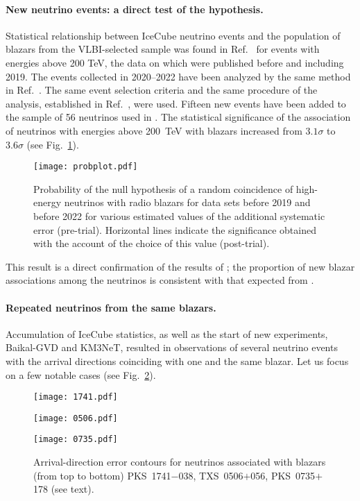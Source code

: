 \documentclass[a4paper,noshowpacs,noshowkeys,floatfix,twocolumn,preprintnumbers,nofootinbib]{revtex4-2}
\begin{document}
\paragraph{New neutrino events: a direct test of the hypothesis.}
Statistical relationship between IceCube neutrino events and the population of blazars from the VLBI-selected sample was found in Ref.~\cite{neutradio1} for events with energies above 200 TeV, the data on which were published before and including 2019. The events collected in 2020--2022 have been analyzed by the same method in Ref.~\cite{neutradio2022}. The same event selection criteria and the same procedure of the analysis, established in Ref.~\cite{neutradio1}, were used. Fifteen new events have been added to the sample of 56 neutrinos used in \cite{neutradio1}. The statistical significance of the association of neutrinos with energies above 200~TeV with blazars increased from $3.1\sigma$ to $3.6\sigma$ (see Fig.~\ref{fig:neutradio2022}).
\begin{figure}
\centerline{\texttt{[image: probplot.pdf]}}
\caption{\label{fig:neutradio2022}
Probability of the null hypothesis of a random coincidence of high-energy neutrinos with radio blazars for data sets before 2019 and before 2022 for various estimated values of the additional systematic error (pre-trial). Horizontal lines indicate the significance obtained with the account of the choice of this value (post-trial).}
\end{figure}
This result is a direct confirmation of the results of \cite{neutradio1}; the proportion of new blazar associations \cite{neutradio2022} among the neutrinos is consistent with that expected from \cite{neutradio1}.

\paragraph{Repeated neutrinos from the same blazars.}
Accumulation of IceCube statistics, as well as the start of new experiments, Baikal-GVD and KM3NeT, resulted in observations of several neutrino events with the arrival directions coinciding with one and the same blazar. Let us focus on a few notable cases (see Fig.~\ref{fig:doublets}).
\begin{figure}
\centerline{\texttt{[image: 1741.pdf]}}
\centerline{\texttt{[image: 0506.pdf]}}
\centerline{\texttt{[image: 0735.pdf]}}
\caption{\label{fig:doublets}
Arrival-direction error contours for neutrinos associated with blazars (from top to bottom) PKS~1741$-$038, TXS~0506$+$056,
PKS~0735$+$178 (see text). }
\end{figure}
\end{document}
